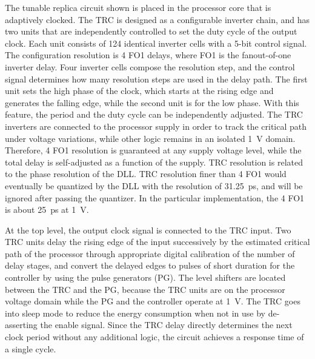 \documentclass[graybox]{svmult}
\begin{document}
The tunable replica circuit shown is placed in the processor core that is adaptively clocked.
The TRC is designed as a configurable inverter chain, and has two units that are independently controlled to set the duty cycle of the output clock.
Each unit consists of 124 identical inverter cells with a 5-bit control signal.
The configuration resolution is 4 FO1 delays, where FO1 is the fanout-of-one inverter delay.
Four inverter cells compose the resolution step, and the control signal determines how many resolution steps are used in the delay path.
The first unit sets the high phase of the clock, which starts at the rising edge and generates the falling edge, while the second unit is for the low phase.
With this feature, the period and the duty cycle can be independently adjusted.
The TRC inverters are connected to the processor supply in order to track the critical path under voltage variations, while other logic remains in an isolated \SI{1}{V} domain.
Therefore, 4 FO1 resolution is guaranteed at any supply voltage level, while the total delay is self-adjusted as a function of the supply.
TRC resolution is related to the phase resolution of the DLL.
TRC resolution finer than 4 FO1 would eventually be quantized by the DLL with the resolution of \SI{31.25}{\pico\second}, and will be ignored after passing the quantizer.
In the particular implementation, the 4 FO1 is about \SI{25}{\pico\second} at \SI{1}{\volt}.

At the top level, the output clock signal is connected to the TRC input.
Two TRC units delay the rising edge of the input successively by the estimated critical path of the processor through appropriate digital calibration of the number of delay stages, and convert the delayed edges to pulses of short duration for the controller by using the pulse generators (PG).
The level shifters are located between the TRC and the PG, because the TRC units are on the processor voltage domain while the PG and the controller operate at \SI{1}{\volt}.
The TRC goes into sleep mode to reduce the energy consumption when not in use by de-asserting the enable signal.
Since the TRC delay directly determines the next clock period without any additional logic, the circuit achieves a response time of a single cycle.
\end{document}
